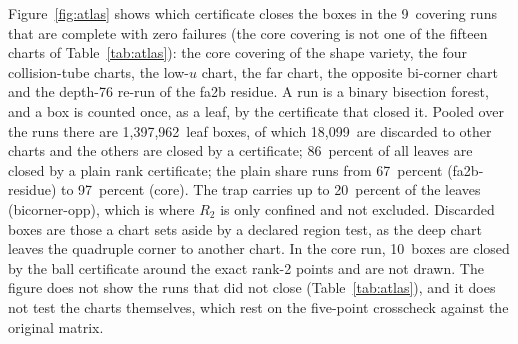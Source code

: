\documentclass[11pt]{article}
\theoremstyle{definition}
\theoremstyle{remark}
\newcommand{\numAtlasDiscarded}{18{,}099}
\newcommand{\numAtlasTrapMax}{20}
\newcommand{\numAtlasTrapRun}{bicorner-opp}
\newcommand{\numAtlasCertMin}{67}
\newcommand{\numAtlasCertMinRun}{fa2b-residue}
\newcommand{\numAtlasCertMax}{97}
\newcommand{\numAtlasCertMaxRun}{core}
\newcommand{\numAtlasRuns}{9}
\newcommand{\numAtlasLeaves}{1{,}397{,}962}
\newcommand{\numAtlasBall}{10}
\newcommand{\numAtlasCertShare}{86}
\begin{document}
Figure~\ref{fig:atlas} shows which certificate closes the boxes in the \numAtlasRuns\ covering runs that are complete with zero failures
(the core covering is not one of the fifteen charts of Table~\ref{tab:atlas}): the core covering of the shape variety, the four collision-tube
charts, the low-$u$ chart, the far chart, the opposite bi-corner chart and the depth-76 re-run of the fa2b residue. A run is a
binary bisection forest, and a box is counted once, as a leaf, by the certificate that closed it. Pooled over the
runs there are \numAtlasLeaves\ leaf boxes, of which \numAtlasDiscarded\ are discarded to other charts and the others are closed by a certificate;
\numAtlasCertShare\ percent of all leaves are closed by a plain rank certificate; the plain share
runs from \numAtlasCertMin\ percent (\numAtlasCertMinRun) to \numAtlasCertMax\ percent (\numAtlasCertMaxRun). The trap
carries up to \numAtlasTrapMax\ percent of the leaves (\numAtlasTrapRun), which is where $R_2$ is only confined and not excluded. Discarded boxes are those a chart sets aside by a declared region test, as the deep chart leaves the quadruple corner to another chart. In the core run,
\numAtlasBall\ boxes are closed by the ball certificate around the exact rank-2 points and are not drawn. The figure does not
show the runs that did not close (Table~\ref{tab:atlas}), and it does not test the charts themselves, which rest on the
five-point crosscheck against the original matrix.
\end{document}
